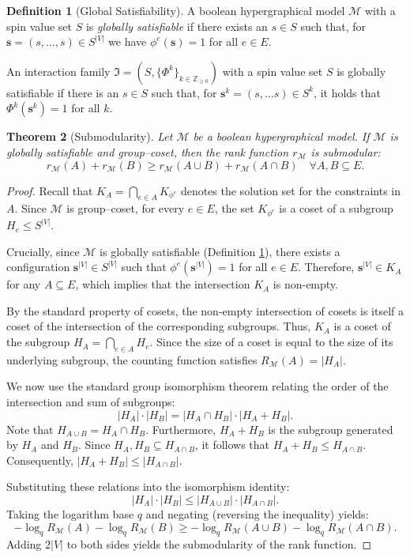 \documentclass[11pt,reqno]{amsart}
\newcommand{\vecs}{\boldsymbol{s}}
\newcommand{\Mo}{\mathcal{M}}
\newcommand{\IFam}{\mathfrak{I}}
\newcommand{\sset}{spin value set }
\theoremstyle{plain}
\newtheorem{theorem}{Theorem}[section]
\theoremstyle{definition}
\newtheorem{definition}[theorem]{Definition}
\numberwithin{equation}{section}
\begin{document}
\begin{definition}[Global Satisfiability]
\label{def:global_satisfiable}
A boolean hypergraphical model $\Mo$ with a \sset $S$ is \emph{globally satisfiable} if there exists an $s \in S$ such that, for $\vecs=(s, \dots, s) \in S^{|V|}$ we have $\phi^e(\vecs)=1$ for all $e \in E$. 

An interaction family $\IFam = (S,\{ \Phi^k\}_{k \in \mathbb{Z}_{\geq 0}})$ with a \sset $S$ is globally satisfiable if there is an $s \in S$ such that, for $\vecs^k = (s, \dots s) \in S^k$, it holds that $\Phi^k(\vecs^k)=1$ for all $k$.
\end{definition}

\begin{theorem}[Submodularity]
\label{thm:submodularity}
    Let $\Mo$ be a boolean hypergraphical model. If $\Mo$ is globally satisfiable and group--coset, then the rank function $r_{\Mo}$ is submodular:
    \[ r_{\Mo}(A) + r_{\Mo}(B) \geq r_{\Mo}(A \cup B) + r_{\Mo}(A \cap B) \quad \forall A, B \subseteq E. \]
\end{theorem}
\begin{proof}
    Recall that $K_A = \bigcap_{e \in A} K_{\phi^e}$ denotes the solution set for the constraints in $A$. 
    Since $\Mo$ is group--coset, for every $e \in E$, the set $K_{\phi^e}$ is a coset of a subgroup $H_e \leq S^{|V|}$.

    Crucially, since $\Mo$ is globally satisfiable (Definition \ref{def:global_satisfiable}), there exists a configuration $\vecs^{|V|} \in S^{|V|}$ such that $\phi^e(\vecs^{|V|}) = 1$ for all $e \in E$. 
    Therefore, $\vecs^{|V|} \in K_A$ for any $A \subseteq E$, which implies that the intersection $K_A$ is non-empty.

    By the standard property of cosets, the non-empty intersection of cosets is itself a coset of the intersection of the corresponding subgroups. 
    Thus, $K_A$ is a coset of the subgroup $H_A = \bigcap_{e \in A} H_e$.
    Since the size of a coset is equal to the size of its underlying subgroup, the counting function satisfies $R_{\Mo}(A) = |H_A|$.
    
    We now use the standard group isomorphism theorem relating the order of the intersection and sum of subgroups: 
    \[ |H_A| \cdot |H_B| = |H_A \cap H_B| \cdot |H_A + H_B|. \]
    Note that $H_{A \cup B} = H_A \cap H_B$. 
    Furthermore, $H_A + H_B$ is the subgroup generated by $H_A$ and $H_B$. Since $H_A, H_B \subseteq H_{A \cap B}$, it follows that $H_A + H_B \leq H_{A \cap B}$. 
    Consequently, $|H_A + H_B| \leq |H_{A \cap B}|$.
    
    Substituting these relations into the isomorphism identity:
    \[ |H_A| \cdot |H_B| \leq |H_{A \cup B}| \cdot |H_{A \cap B}|. \]
    Taking the logarithm base $q$ and negating (reversing the inequality) yields:
    \[ -\log_q R_{\Mo}(A) - \log_q R_{\Mo}(B) \geq -\log_q R_{\Mo}(A \cup B) - \log_q R_{\Mo}(A \cap B). \]
    Adding $2|V|$ to both sides yields the submodularity of the rank function.
\end{proof}
\end{document}
